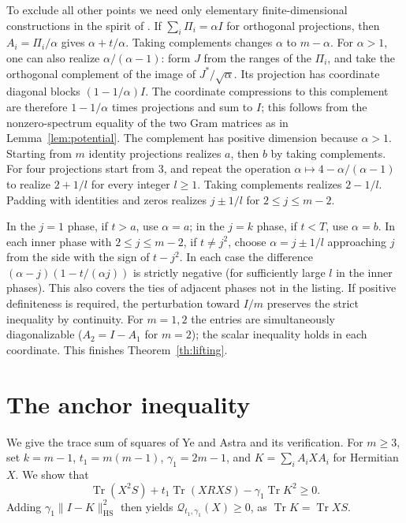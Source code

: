 \documentclass[11pt]{article}
\newcommand{\Tr}{\operatorname{Tr}}
\newcommand{\HS}{\mathrm{HS}}
\begin{document}
To exclude all other points we need only elementary finite-dimensional
constructions in the spirit of \cite{krs}. If
\(\sum_i\Pi_i=\alpha I\) for orthogonal projections, then
\(A_i=\Pi_i/\alpha\) gives \(\alpha+t/\alpha\).
Taking complements changes \(\alpha\) to \(m-\alpha\).
For \(\alpha>1\), one can also realize \(\alpha/(\alpha-1)\):
form \(J\) from the ranges of the \(\Pi_i\), and take the
orthogonal complement of the image of \(J^*/\sqrt\alpha\).
Its projection has coordinate diagonal blocks
\((1-1/\alpha)I\). The coordinate compressions to this complement
are therefore \(1-1/\alpha\) times projections and sum to \(I\);
this follows from the nonzero-spectrum equality of the two Gram
matrices as in Lemma~\ref{lem:potential}. The complement has positive
dimension because \(\alpha>1\). Starting from \(m\) identity
projections realizes \(a\), then \(b\) by taking complements.
For four projections start from \(3\), and repeat the operation
\(\alpha\mapsto4-\alpha/(\alpha-1)\) to realize \(2+1/l\) for every
integer \(l\ge1\). Taking complements realizes \(2-1/l\).
Padding with identities and zeros realizes \(j\pm1/l\)
for \(2\le j\le m-2\).

In the \(j=1\) phase, if \(t>a\), use \(\alpha=a\);
in the \(j=k\) phase, if \(t<T\), use \(\alpha=b\).
In each inner phase with \(2\le j\le m-2\), if \(t\ne j^2\),
choose \(\alpha=j\pm1/l\) approaching \(j\) from the side
with the sign of \(t-j^2\). In each case the difference
\((\alpha-j)(1-t/(\alpha j))\) is strictly negative
(for sufficiently large \(l\) in the inner phases).
This also covers the ties of adjacent phases not in the listing.
If positive definiteness is required, the perturbation toward \(I/m\)
preserves the strict inequality by continuity.
For \(m=1,2\) the entries are simultaneously diagonalizable
(\(A_2=I-A_1\) for \(m=2\)); the scalar inequality holds in
each coordinate. This finishes Theorem~\ref{th:lifting}.

\appendix
\section{The anchor inequality}\label{app:anchor}

We give the trace sum of squares of Ye and Astra \cite{anchor}
and its verification. For \(m\ge3\), set \(k=m-1\),
\(t_1=m(m-1)\), \(\gamma_1=2m-1\), and \(K=\sum_i A_i X A_i\)
for Hermitian \(X\). We show that
\begin{equation}\label{eq:anchor-sos}
 \Tr(X^2S)+t_1\Tr(XRXS)-\gamma_1\Tr K^2\ge0 .
\end{equation}
Adding \(\gamma_1\|I-K\|_{\HS}^2\) then yields
\(\mathcal Q_{t_1,\gamma_1}(X)\ge0\), as \(\Tr K=\Tr XS\).
\end{document}

